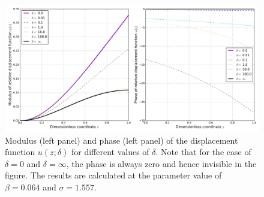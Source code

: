 \documentclass{article}
\begin{document}
\begin{figure}[!htbp]
    \centering
    \includegraphics[width=\textwidth]{./img_eig_asy/fig_sol_analytic_disp_fun.jpg}
    \caption{Modulus (left panel) and phase (left panel) of the displacement function $u(z;\delta)$ for different values of $\delta$. Note that for the case of $\delta = 0$ and $\delta = \infty$, the phase is always zero and hence invisible in the figure. The results are calculated at the parameter value of $\beta = 0.064$ and $\sigma = 1.557$.}
    \label{fig:fig_sol_analytic_disp_fun}
\end{figure}
\end{document}
